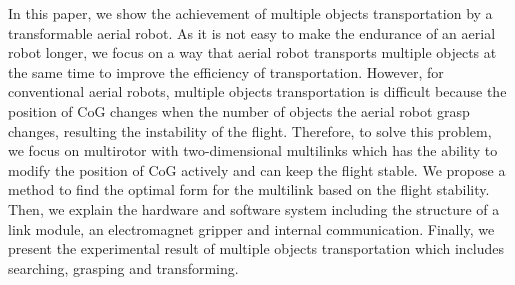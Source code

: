 In this paper, we show the achievement of multiple objects transportation by a transformable aerial robot. As it is not easy to make the endurance of an aerial robot longer, we focus on a way that aerial robot transports multiple objects at the same time to improve the efficiency of transportation. However, for conventional aerial robots, multiple objects transportation is difficult because the position of CoG changes when the number of objects the aerial robot grasp changes, resulting the instability of the flight. Therefore, to solve this problem, we focus on multirotor with two-dimensional multilinks which has the ability to modify the position of CoG actively and can keep the flight stable. We propose a method to find the optimal form for the multilink based on the flight stability. Then, we explain the hardware and software system including the structure of a link module, an electromagnet gripper and internal communication. Finally, we present the experimental result of multiple objects transportation which includes searching, grasping and transforming.
